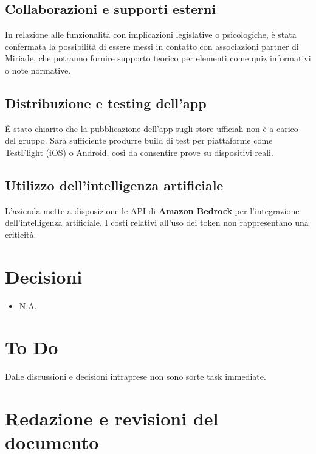 \documentclass[a4paper,12pt]{article}
\begin{document}
\subsection{Collaborazioni e supporti esterni}
In relazione alle funzionalità con implicazioni legislative o psicologiche, è stata confermata la possibilità di essere messi in contatto con associazioni partner di Miriade, che potranno fornire supporto teorico per elementi come quiz informativi o note normative.

\subsection{Distribuzione e testing dell’app}
È stato chiarito che la pubblicazione dell’app sugli store ufficiali non è a carico del gruppo.  
Sarà sufficiente produrre build di test per piattaforme come TestFlight (iOS) o Android, così da consentire prove su dispositivi reali.

\subsection{Utilizzo dell’intelligenza artificiale}
L’azienda mette a disposizione le API di \textbf{Amazon Bedrock} per l’integrazione dell’intelligenza artificiale.  
I costi relativi all’uso dei token non rappresentano una criticità.

\section{Decisioni}
\begin{itemize}
    \item N.A.
\end{itemize}

\section{To Do}
Dalle discussioni e decisioni intraprese non sono sorte task immediate.

\clearpage
\section{Redazione e revisioni del documento}
\end{document}
